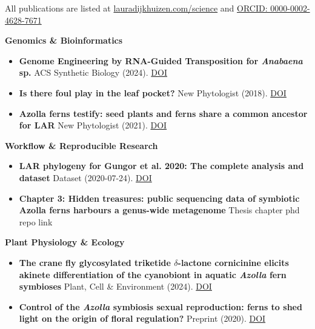 \documentclass[a4paper,10pt]{article}
\begin{document}

All publications are listed at \href{https://lauradijkhuizen.com/science}{lauradijkhuizen.com/science}  and 
\textcolor[HTML]{A6CE39}{\faOrcid}\href{https://orcid.org/0000-0002-4628-7671}{ORCID: 0000-0002-4628-7671}

\textbf{Genomics \& Bioinformatics}
  \begin{itemize}
    \item \textbf{Genome Engineering by RNA-Guided Transposition for \textit{Anabaena} sp.}  
      ACS Synthetic Biology (2024). \href{https://doi.org/10.1021/acssynbio.3c00583}{DOI}
    \item \textbf{Is there foul play in the leaf pocket?}  
      New Phytologist (2018). \href{https://doi.org/10.1111/nph.14843}{DOI}
      \item \textbf{Azolla ferns testify: seed plants and ferns share a common ancestor for LAR}  
        New Phytologist (2021). \href{https://doi.org/10.1111/nph.16896}{DOI}
  \end{itemize}

\noindent\textbf{Workflow \& Reproducible Research}
  \begin{itemize}
    \item \textbf{LAR phylogeny for Gungor et al. 2020: The complete analysis and dataset}  
      Dataset (2020-07-24). \href{https://doi.org/10.5281/zenodo.3959057}{DOI}
    \item \textbf{Chapter 3: Hidden treasures: public sequencing data of symbiotic Azolla ferns harbours a genus-wide metagenome}
      Thesis chapter phd repo link
  \end{itemize}

\noindent\textbf{Plant Physiology \& Ecology}
  \begin{itemize}
    \item \textbf{The crane fly glycosylated triketide $\delta$-lactone cornicinine elicits akinete differentiation of the cyanobiont in aquatic \textit{Azolla} fern symbioses}  
      Plant, Cell \& Environment (2024). \href{https://doi.org/10.1111/pce.14907}{DOI}
    \item \textbf{Control of the \textit{Azolla} symbiosis sexual reproduction: ferns to shed light on the origin of floral regulation?}  
      Preprint (2020). \href{https://doi.org/10.3389/fpls.2021.693039}{DOI}
  \end{itemize}
\end{document}
